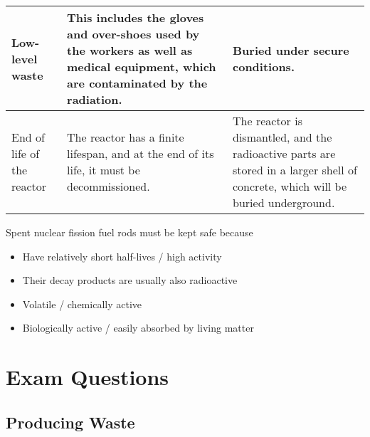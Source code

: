 \documentclass[a4paper,12pt]{article}
\let\oldsection\section
\renewcommand\section{\clearpage\oldsection}
\begin{document}
\begin{longtable}{|p{}|p{}|p{}|}
  Low-level waste                                                                                              & This includes the gloves and over-shoes used by the workers as well as medical equipment, which are contaminated by the radiation.                                                                                       & Buried under secure conditions.                                                                                                                         \\ \hline
  End of life of the reactor                                                                                   & The reactor has a finite lifespan, and at the end of its life, it must be decommissioned.                                                                                                                                & The reactor is dismantled, and the radioactive parts are stored in a larger shell of concrete, which will be buried underground.                        \\ \hline
\end{longtable}

Spent nuclear fission fuel rods must be kept safe because
\begin{itemize}
  \item Have relatively short half-lives / high activity
  \item Their decay products are usually also radioactive
  \item Volatile / chemically active
  \item Biologically active / easily absorbed by living matter
\end{itemize}

\section{Exam Questions}

\subsection{Producing Waste}
\end{document}
